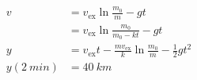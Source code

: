 \documentclass{article}
\begin{document}
\setcounter{subsection}{12}
\subsection{}

\begin{align*}
  v               & = v_\text{ex} \ln \frac{m_0}{m} - g t                                           \\
                  & = v_\text{ex} \ln \frac{m_0}{m_0 - k t} - g t                                   \\
  y               & = v_\text{ex} t - \frac{m v_\text{ex}}{k} \ln \frac{m_0}{m} - \frac{1}{2} g t^2 \\
  y(\qty{2}{min}) & = \qty{40}{km}
\end{align*}

\setcounter{subsection}{14}
\subsection{}
\end{document}
